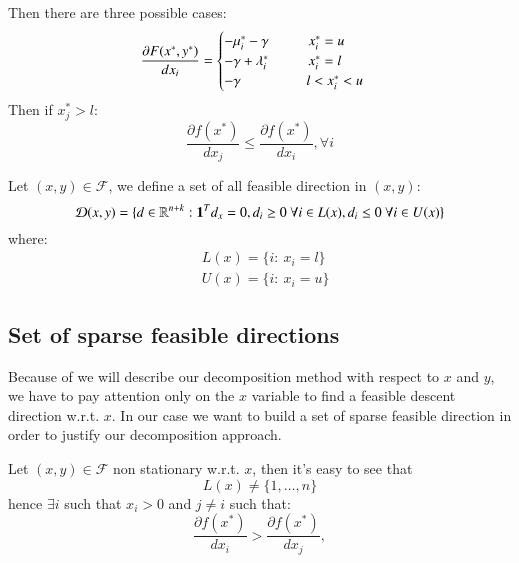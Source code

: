 Then there are three possible cases:
\begin{equation}
 \frac{\partial F(x^*,y^*)}{dx_i} = \begin{cases} -\mu_i^* -\gamma \hspace{1cm} x^*_i =u \\
 -\gamma+\lambda^*_i \hspace{1cm} x^*_i =l \\
 -\gamma \hspace{1.65cm} l<x^*_i <u 
\end{cases}
\end{equation}
Then if $x^*_j>l$:
\begin{equation}
 \frac{\partial f(x^*)}{dx_j} \le \frac{\partial f(x^*)}{dx_i}, \forall i
\end{equation}

Let $(x,y) \in \mathcal{F}$, we define a set of all feasible direction in $(x,y)$:
\begin{equation}
 \mathcal{D}(x,y)=\{ d \in \mathbb{R}^{n+k}: \mathbf{1}^Td_x=0, d_i\ge 0 \ \forall i \in L(x), d_i\le 0 \ \forall i \in U(x)\}
\end{equation}
where:
\begin{equation}
 \begin{aligned}
  &L(x)=\{ i: \ x_i=l\}\\
  &U(x)=\{ i: \ x_i=u\}
 \end{aligned}
\end{equation}



\subsection{Set of sparse feasible directions}
Because of we will describe our decomposition method with respect to $x$ and $y$, we have to pay attention only on the $x$ variable to find a feasible descent direction w.r.t. $x$. 
In our case we want to build a set of sparse feasible direction in order to justify our decomposition approach.

Let $(x,y) \in \mathcal{F}$ non stationary w.r.t. $x$, then it's easy to see that
\begin{equation}
 L(x)\ne \{1,\ldots,n\}
\end{equation}
hence $\exists i$ such that $x_i>0$ and $j \ne i$ such that:
\begin{equation}
 \frac{\partial f(x^*)}{dx_i} > \frac{\partial f(x^*)}{dx_j}, 
\end{equation}

